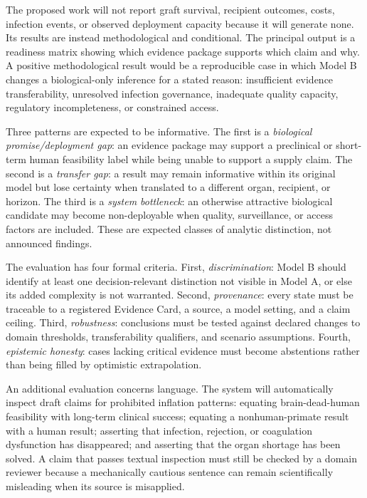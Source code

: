 \documentclass[conference]{IEEEtran}
\begin{document}
The proposed work will not report graft survival, recipient outcomes, costs, infection events, or observed deployment capacity because it will generate none. Its results are instead methodological and conditional. The principal output is a readiness matrix showing which evidence package supports which claim and why. A positive methodological result would be a reproducible case in which Model B changes a biological-only inference for a stated reason: insufficient evidence transferability, unresolved infection governance, inadequate quality capacity, regulatory incompleteness, or constrained access.

Three patterns are expected to be informative. The first is a \emph{biological promise/deployment gap}: an evidence package may support a preclinical or short-term human feasibility label while being unable to support a supply claim. The second is a \emph{transfer gap}: a result may remain informative within its original model but lose certainty when translated to a different organ, recipient, or horizon. The third is a \emph{system bottleneck}: an otherwise attractive biological candidate may become non-deployable when quality, surveillance, or access factors are included. These are expected classes of analytic distinction, not announced findings.

The evaluation has four formal criteria. First, \emph{discrimination}: Model B should identify at least one decision-relevant distinction not visible in Model A, or else its added complexity is not warranted. Second, \emph{provenance}: every state must be traceable to a registered Evidence Card, a source, a model setting, and a claim ceiling. Third, \emph{robustness}: conclusions must be tested against declared changes to domain thresholds, transferability qualifiers, and scenario assumptions. Fourth, \emph{epistemic honesty}: cases lacking critical evidence must become abstentions rather than being filled by optimistic extrapolation.

An additional evaluation concerns language. The system will automatically inspect draft claims for prohibited inflation patterns: equating brain-dead-human feasibility with long-term clinical success; equating a nonhuman-primate result with a human result; asserting that infection, rejection, or coagulation dysfunction has disappeared; and asserting that the organ shortage has been solved. A claim that passes textual inspection must still be checked by a domain reviewer because a mechanically cautious sentence can remain scientifically misleading when its source is misapplied.
\end{document}
